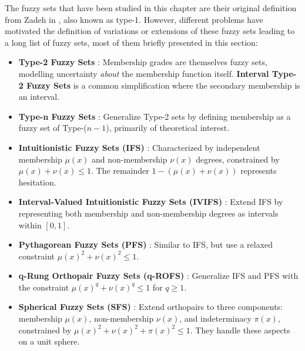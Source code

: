 
The fuzzy sets that have been studied in this chapter are their original definition from Zadeh in \cite{Zadeh1965}, also known as type-1. However, different problems have motivated the definition of variations or extensions of these fuzzy sets leading to a long list of fuzzy sets, most of them briefly presented in this section:

\begin{itemize}
    \item \textbf{Type-2 Fuzzy Sets} \cite{Zadeh1975}: Membership grades are themselves fuzzy sets, modelling uncertainty \emph{about} the membership function itself. \textbf{Interval Type-2 Fuzzy Sets} is a common simplification where the secondary membership is an interval.
 
    \item \textbf{Type-n Fuzzy Sets} \cite{Turksen1986_TypeNRelated}: Generalize Type-2 sets by defining membership as a fuzzy set of Type-($n-1$), primarily of theoretical interest.

    \item \textbf{Intuitionistic Fuzzy Sets (IFS)} \cite{Atanassov1986}: Characterized by independent membership $\mu(x)$ and non-membership $\nu(x)$ degrees, constrained by $\mu(x) + \nu(x) \leq 1$. The remainder $1 - (\mu(x) + \nu(x))$ represents hesitation.

    \item \textbf{Interval-Valued Intuitionistic Fuzzy Sets (IVIFS)} \cite{AtanassovGargov1989}: Extend IFS by representing both membership and non-membership degrees as intervals within $[0,1]$.

    \item \textbf{Pythagorean Fuzzy Sets (PFS)} \cite{Yager2013_Pythagorean}: Similar to IFS, but use a relaxed constraint $\mu(x)^2 + \nu(x)^2 \leq 1$. 

    \item \textbf{q-Rung Orthopair Fuzzy Sets (q-ROFS)} \cite{Yager2017_qRung}: Generalize IFS and PFS with the constraint $\mu(x)^q + \nu(x)^q \leq 1$ for $q \ge 1$.

    \item \textbf{Spherical Fuzzy Sets (SFS)} \cite{GundogduKahraman2019_Spherical}: Extend orthopairs to three components: membership $\mu(x)$, non-membership $\nu(x)$, and indeterminacy $\pi(x)$, constrained by $\mu(x)^2 + \nu(x)^2 + \pi(x)^2 \leq 1$. They handle these aspects on a unit sphere.


\end{itemize}
